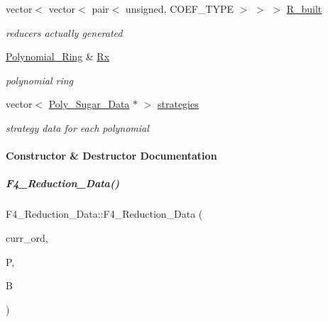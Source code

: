 \begin{DoxyCompactItemize}
\mbox{\label{group___g_b_computation_a341e74dadaec6a56cd944f17be9b9320}} 
vector$<$ vector$<$ pair$<$ unsigned, C\+O\+E\+F\+\_\+\+T\+Y\+PE $>$ $>$ $>$ \hyperlink{group___g_b_computation_a341e74dadaec6a56cd944f17be9b9320}{R\+\_\+built}
\begin{DoxyCompactList}\small\item\em reducers actually generated \end{DoxyCompactList}\item 
\mbox{\label{group___g_b_computation_a4a1dcdff469ec1061109dc33aaceb011}} 
\hyperlink{group__polygroup_class_polynomial___ring}{Polynomial\+\_\+\+Ring} \& \hyperlink{group___g_b_computation_a4a1dcdff469ec1061109dc33aaceb011}{Rx}
\begin{DoxyCompactList}\small\item\em polynomial ring \end{DoxyCompactList}\item 
\mbox{\label{group___g_b_computation_a7536f2bbcdcfcadd45c209694c31e3a4}} 
vector$<$ \hyperlink{group__strategygroup_class_poly___sugar___data}{Poly\+\_\+\+Sugar\+\_\+\+Data} $\ast$ $>$ \hyperlink{group___g_b_computation_a7536f2bbcdcfcadd45c209694c31e3a4}{strategies}
\begin{DoxyCompactList}\small\item\em strategy data for each polynomial \end{DoxyCompactList}\end{DoxyCompactItemize}


\paragraph{Constructor \& Destructor Documentation}
\mbox{\label{group___g_b_computation_ab908becf5415be27dd0d4e4391ee2c3b}} 
\subparagraph{\texorpdfstring{F4\+\_\+\+Reduction\+\_\+\+Data()}{F4\_Reduction\_Data()}\hspace{0.1cm}{\footnotesize\ttfamily [1/2]}}
{\footnotesize\ttfamily F4\+\_\+\+Reduction\+\_\+\+Data\+::\+F4\+\_\+\+Reduction\+\_\+\+Data (\begin{DoxyParamCaption}\item[{const \hyperlink{group__orderinggroup_class_w_grevlex}{W\+Grevlex} $\ast$}]{curr\+\_\+ord,  }\item[{const list$<$ \hyperlink{group___g_b_computation_class_critical___pair___dynamic}{Critical\+\_\+\+Pair\+\_\+\+Dynamic} $\ast$$>$ \&}]{P,  }\item[{const list$<$ \hyperlink{group__polygroup_class_abstract___polynomial}{Abstract\+\_\+\+Polynomial} $\ast$$>$ \&}]{B }\end{DoxyParamCaption})}



